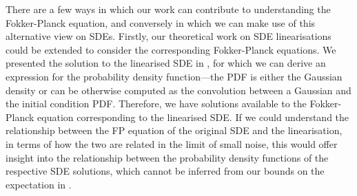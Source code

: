There are a few ways in which our work can contribute to understanding the Fokker-Planck equation, and conversely in which we can make use of this alternative view on SDEs.
Firstly, our theoretical work on SDE linearisations could be extended to consider the corresponding Fokker-Planck equations.
We presented the solution to the linearised SDE in , for which we can derive an expression for the probability density function---the PDF is either the Gaussian density or can be otherwise computed as the convolution between a Gaussian and the initial condition PDF.
Therefore, we have solutions available to the Fokker-Planck equation corresponding to the linearised SDE.
If we could understand the relationship between the FP equation of the original SDE and the linearisation, in terms of how the two are related in the limit of small noise, this would offer insight into the relationship between the probability density functions of the respective SDE solutions, which cannot be inferred from our bounds on the expectation in .

